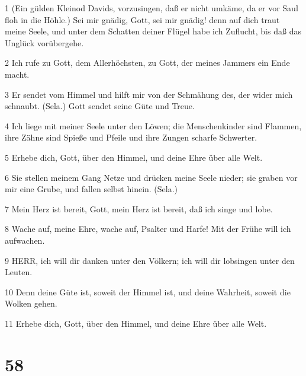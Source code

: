 \par 1 (Ein gülden Kleinod Davids, vorzusingen, daß er nicht umkäme, da er vor Saul floh in die Höhle.) Sei mir gnädig, Gott, sei mir gnädig! denn auf dich traut meine Seele, und unter dem Schatten deiner Flügel habe ich Zuflucht, bis daß das Unglück vorübergehe.
\par 2 Ich rufe zu Gott, dem Allerhöchsten, zu Gott, der meines Jammers ein Ende macht.
\par 3 Er sendet vom Himmel und hilft mir von der Schmähung des, der wider mich schnaubt. (Sela.) Gott sendet seine Güte und Treue.
\par 4 Ich liege mit meiner Seele unter den Löwen; die Menschenkinder sind Flammen, ihre Zähne sind Spieße und Pfeile und ihre Zungen scharfe Schwerter.
\par 5 Erhebe dich, Gott, über den Himmel, und deine Ehre über alle Welt.
\par 6 Sie stellen meinem Gang Netze und drücken meine Seele nieder; sie graben vor mir eine Grube, und fallen selbst hinein. (Sela.)
\par 7 Mein Herz ist bereit, Gott, mein Herz ist bereit, daß ich singe und lobe.
\par 8 Wache auf, meine Ehre, wache auf, Psalter und Harfe! Mit der Frühe will ich aufwachen.
\par 9 HERR, ich will dir danken unter den Völkern; ich will dir lobsingen unter den Leuten.
\par 10 Denn deine Güte ist, soweit der Himmel ist, und deine Wahrheit, soweit die Wolken gehen.
\par 11 Erhebe dich, Gott, über den Himmel, und deine Ehre über alle Welt.

\chapter{58}

